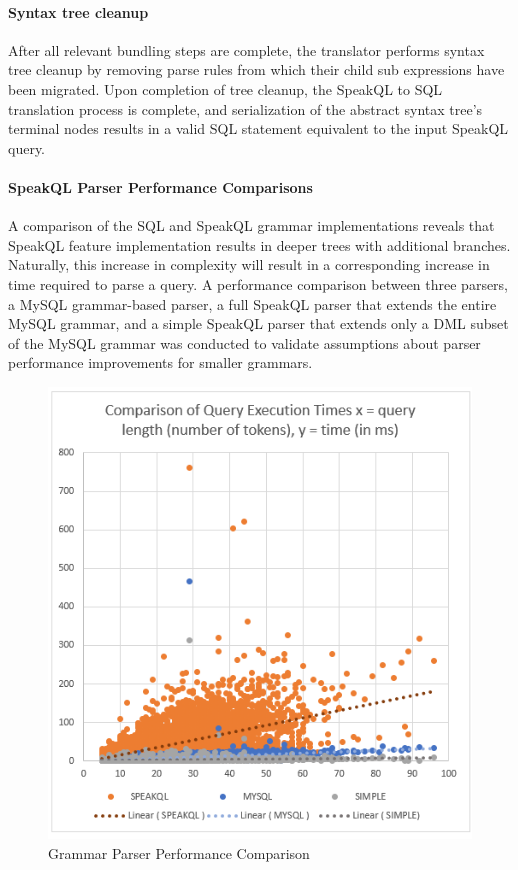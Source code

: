 
\paragraph{Syntax tree cleanup}

After all relevant bundling steps are complete, the translator performs syntax tree cleanup by removing parse rules from which their child sub expressions have been migrated. Upon completion of tree cleanup, the SpeakQL to SQL translation process is complete, and serialization of the abstract syntax tree's terminal nodes results in a valid SQL statement equivalent to the input SpeakQL query.


\paragraph{\textbf{SpeakQL Parser Performance Comparisons}}
A comparison of the SQL and SpeakQL grammar implementations reveals that SpeakQL feature implementation results in deeper trees with additional branches. Naturally, this increase in complexity will result in a corresponding increase in time required to parse a query. A performance comparison between three parsers, a MySQL grammar-based parser, a full SpeakQL parser that extends the entire MySQL grammar, and a simple SpeakQL parser that extends only a DML subset of the MySQL grammar was conducted to validate assumptions about parser performance improvements for smaller grammars. 

\begin{figure}
    \centering
    \includegraphics[width=0.5\linewidth]{figures/parser-performance-plot.png}
    \caption{Grammar Parser Performance Comparison}
    \label{fig:parserperformanceplot}
\end{figure}

